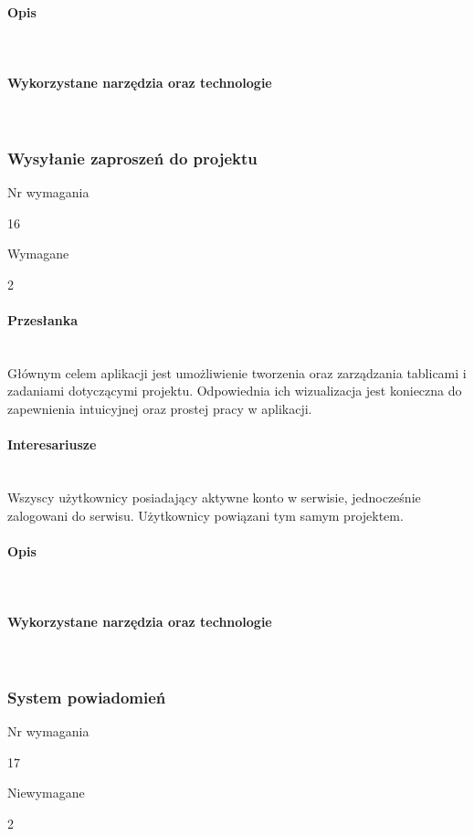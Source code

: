 \documentclass[eng,printmode]{mgr}
\begin{document}
\paragraph{Opis}\ \\

\paragraph{Wykorzystane narzędzia oraz technologie}\ \\
\newpage

\subsubsection{Wysyłanie zaproszeń do projektu}
\begin{labeling}{Nr wymagania}
\item [Nr wymagania:] 16
\item [Typ:] Wymagane
\item [Powiązania:] 2
\end{labeling}

\paragraph{Przesłanka}\ \\
Głównym celem aplikacji jest umożliwienie tworzenia oraz zarządzania tablicami i zadaniami dotyczącymi projektu. Odpowiednia ich wizualizacja jest konieczna do zapewnienia intuicyjnej oraz prostej pracy w aplikacji.

\paragraph{Interesariusze}\ \\
Wszyscy użytkownicy posiadający aktywne konto w serwisie, jednocześnie zalogowani do serwisu. Użytkownicy powiązani tym samym projektem.

\paragraph{Opis}\ \\

\paragraph{Wykorzystane narzędzia oraz technologie}\ \\
\newpage

\subsubsection{System powiadomień}
\begin{labeling}{Nr wymagania}
\item [Nr wymagania:] 17
\item [Typ:] Niewymagane
\item [Powiązania:] 2
\end{labeling}
\end{document}
